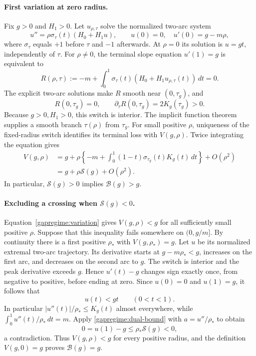 \paragraph{First variation at zero radius.}
Fix $g>0$ and $H_1>0$.  Let $u_{\rho,\tau}$ solve the normalized
two-arc system
\[
 u''=\rho\sigma_\tau(t)(H_0+H_1u),\qquad
 u(0)=0,\quad u'(0)=g-m\rho,
\]
where $\sigma_\tau$ equals $+1$ before $\tau$ and $-1$ afterwards.
At $\rho=0$ its solution is $u=gt$, independently of $\tau$.
For $\rho\ne0$, the terminal slope equation $u'(1)=g$ is equivalent
to
\[
 R(\rho,\tau):=-m+
       \int_0^1\sigma_\tau(t)(H_0+H_1u_{\rho,\tau}(t))\,dt=0.
\]
The explicit two-arc solutions make $R$ smooth near
$(0,\tau_g)$, and
\[
 R(0,\tau_g)=0,\qquad
 \partial_\tau R(0,\tau_g)=2K_g(\tau_g)>0.
\]
Because $g>0,H_1>0$, this switch is interior.  The implicit function
theorem supplies a smooth branch $\tau(\rho)$ from $\tau_g$.
For small positive $\rho$, uniqueness of the fixed-radius switch
identifies its terminal loss with $V(g,\rho)$.
Twice integrating the equation gives
\begin{equation}\label{gapregime:variation}
 \begin{aligned}
 V(g,\rho)
 &=g+\rho\left\{-m+
       \int_0^1(1-t)\sigma_{\tau_g}(t)K_g(t)\,dt\right\}
         +O(\rho^2)\\
 &=g+\rho\mathcal S(g)+O(\rho^2).
 \end{aligned}
\end{equation}
In particular, $\mathcal S(g)>0$ implies
$\mathcal B(g)>g$.

\paragraph{Excluding a crossing when $\mathcal S(g)<0$.}
Equation~\eqref{gapregime:variation} gives $V(g,\rho)<g$ for all
sufficiently small positive $\rho$.  Suppose that this inequality
fails somewhere on $(0,g/m]$.  By continuity there is a first
positive $\rho_*$ with $V(g,\rho_*)=g$.
Let $u$ be its normalized extremal two-arc trajectory.  Its derivative
starts at $g-m\rho_*<g$, increases on the first arc, and decreases
on the second arc to $g$.  The switch is interior and the peak
derivative exceeds $g$.  Hence $u'(t)-g$ changes sign exactly once,
from negative to positive, before ending at zero.
Since $u(0)=0$ and $u(1)=g$, it follows that
\begin{equation}\label{gapregime:below-line}
 u(t)<gt\qquad(0<t<1).
\end{equation}
In particular $|u''(t)|/\rho_*\le K_g(t)$ almost everywhere, while
$\int_0^1u''(t)/\rho_*\,dt=m$.  Apply
\eqref{gapregime:dual-bound} with $a=u''/\rho_*$ to obtain
\[
 0=u(1)-g\le\rho_*\mathcal S(g)<0,
\]
a contradiction.  Thus $V(g,\rho)<g$ for every positive radius,
and the definition $V(g,0)=g$ proves $\mathcal B(g)=g$.

